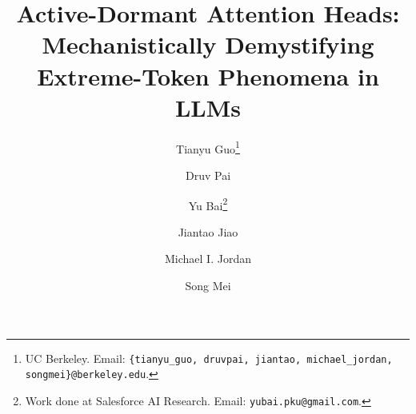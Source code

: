 \documentclass[10pt]{article}
\title{Active-Dormant Attention Heads: 
Mechanistically Demystifying Extreme-Token Phenomena in LLMs}
\begin{document}
\author{
Tianyu Guo\thanks{UC Berkeley. Email: \texttt{\{tianyu\_guo, druvpai, jiantao, michael\_jordan, songmei\}@berkeley.edu}.} \and Druv Pai\footnotemark[1] \and Yu Bai\thanks{Work done at Salesforce AI Research. Email: \texttt{yubai.pku@gmail.com}.} \and Jiantao Jiao\footnotemark[1] \and  Michael I. Jordan\footnotemark[1] \\ \vspace{-1em} \and Song Mei\footnotemark[1]}

\maketitle



% 







% 
% 
% 
% 









\appendix
\makeatletter
\def\renewtheorem#1{%
  \expandafter\let\csname#1\endcsname\relax
  \expandafter\let\csname c@#1\endcsname\relax
  \gdef\renewtheorem@envname{#1}
  \renewtheorem@secpar
}
\def\renewtheorem@secpar{\@ifnextchar[{\renewtheorem@numberedlike}{\renewtheorem@nonumberedlike}}
\def\renewtheorem@numberedlike[#1]#2{\newtheorem{\renewtheorem@envname}[#1]{#2}}
\def\renewtheorem@nonumberedlike#1{  
\def\renewtheorem@caption{#1}
\edef\renewtheorem@nowithin{\noexpand\newtheorem{\renewtheorem@envname}{\renewtheorem@caption}}
\renewtheorem@thirdpar
}
\def\renewtheorem@thirdpar{\@ifnextchar[{\renewtheorem@within}{\renewtheorem@nowithin}}
\def\renewtheorem@within[#1]{\renewtheorem@nowithin[#1]}
\makeatother
\end{document}
